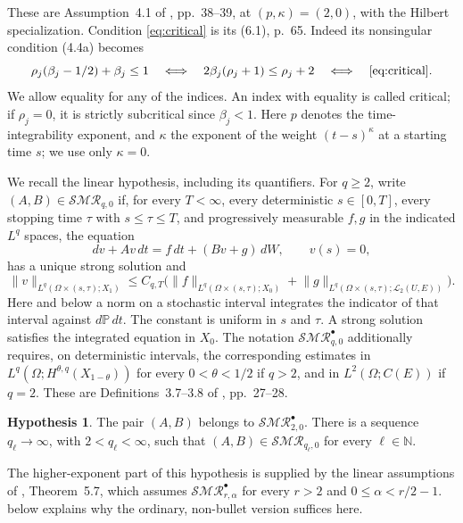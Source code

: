 \documentclass[11pt]{amsart}
\theoremstyle{definition}
\newtheorem{hypothesis}[theorem]{Hypothesis}
\theoremstyle{remark}
\newcommand{\Prob}{\mathbb P}
\newcommand{\N}{\mathbb N}
\newcommand{\SMR}{\mathcal{SMR}}
\newcommand{\HS}{\mathcal L_2(U,E)}
\newcommand{\norm}[2][]{\lVert #2\rVert_{#1}}
\numberwithin{equation}{section}
\begin{document}
These are Assumption~4.1 of \cite{Survey}, pp.~38--39, at
$(p,\kappa)=(2,0)$, with the Hilbert specialization. Condition
\eqref{eq:critical} is its (6.1), p.~65. Indeed its nonsingular condition
(4.4a) becomes
\[
 \rho_j(\beta_j-1/2)+\beta_j\le1
 \quad\Longleftrightarrow\quad
 2\beta_j(\rho_j+1)\le\rho_j+2
 \quad\Longleftrightarrow\quad\eqref{eq:critical}.
\]
We allow equality for any of the indices. An index with equality is called
critical; if $\rho_j=0$, it is strictly subcritical since $\beta_j<1$.
Here $p$ denotes the time-integrability exponent, and $\kappa$ the exponent
of the weight $(t-s)^\kappa$ at a starting time $s$; we use only $\kappa=0$.

We recall the linear hypothesis, including its quantifiers. For $q\ge2$,
write $(A,B)\in\SMR_{q,0}$ if, for every $T<\infty$, every deterministic
$s\in[0,T]$, every stopping time $\tau$ with $s\le\tau\le T$, and
progressively measurable $f,g$ in the indicated $L^q$ spaces, the equation
\begin{equation}\label{eq:linear}
 dv+Av\,dt=f\,dt+(Bv+g)\,dW,\qquad v(s)=0,
\end{equation}
has a unique strong solution and
\begin{equation}\label{eq:mr}
 \norm[L^q(\Omega\times(s,\tau);X_1)]{v}
 \le C_{q,T}\bigl(
 \norm[L^q(\Omega\times(s,\tau);X_0)]{f}
 +\norm[L^q(\Omega\times(s,\tau);\HS)]{g}\bigr).
\end{equation}
Here and below a norm on a stochastic interval integrates the indicator
of that interval against $d\Prob\,dt$. The constant is uniform in $s$
and $\tau$. A strong solution satisfies the integrated equation in $X_0$.
The notation $\SMR^\bullet_{q,0}$ additionally requires, on deterministic
intervals, the corresponding estimates in
$L^q(\Omega;H^{\theta,q}(X_{1-\theta}))$ for every $0<\theta<1/2$ if
$q>2$, and in $L^2(\Omega;C(E))$ if $q=2$.
These are Definitions~3.7--3.8 of \cite{Survey}, pp.~27--28.

\begin{hypothesis}\label{hyp:linear}
The pair $(A,B)$ belongs to $\SMR^\bullet_{2,0}$. There is a sequence
$q_\ell\to\infty$, with $2<q_\ell<\infty$, such that
$(A,B)\in\SMR_{q_\ell,0}$ for every $\ell\in\N$.
\end{hypothesis}

The higher-exponent part of this hypothesis is supplied by the linear
assumptions of \cite{Survey}, Theorem~5.7, which assumes
$\SMR^\bullet_{r,\alpha}$ for every $r>2$ and $0\le\alpha<r/2-1$.
 below explains why the ordinary, non-bullet version
suffices here.
\end{document}
